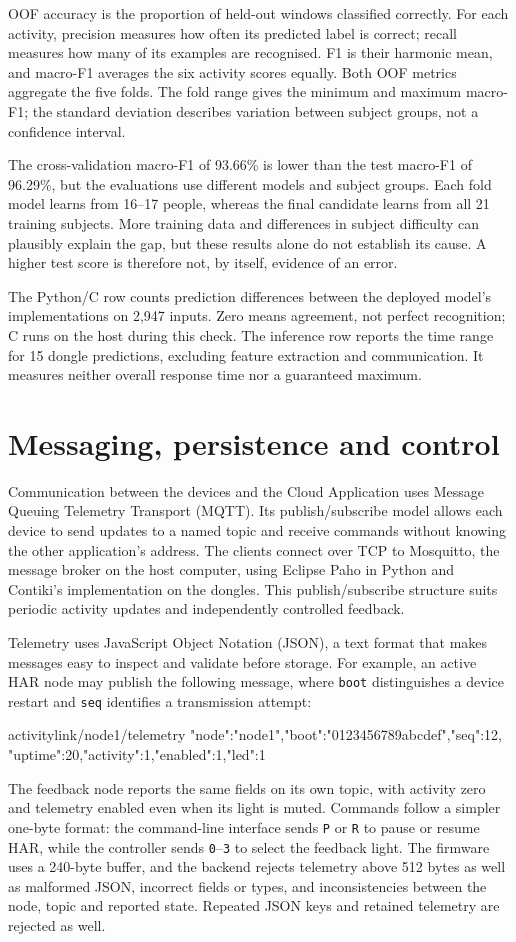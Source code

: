 \documentclass[11pt,a4paper]{article}
\newcommand{\reportsection}[1]{\section{#1}}
\begin{document}
OOF accuracy is the proportion of held-out windows classified correctly. For each activity, precision measures how often its predicted label is correct; recall measures how many of its examples are recognised. F1 is their harmonic mean, and macro-F1 averages the six activity scores equally. Both OOF metrics aggregate the five folds. The fold range gives the minimum and maximum macro-F1; the standard deviation describes variation between subject groups, not a confidence interval.

The cross-validation macro-F1 of 93.66\% is lower than the test macro-F1 of 96.29\%, but the evaluations use different models and subject groups. Each fold model learns from 16--17 people, whereas the final candidate learns from all 21 training subjects. More training data and differences in subject difficulty can plausibly explain the gap, but these results alone do not establish its cause. A higher test score is therefore not, by itself, evidence of an error.

The Python/C row counts prediction differences between the deployed model's implementations on 2,947 inputs. Zero means agreement, not perfect recognition; C runs on the host during this check. The inference row reports the time range for 15 dongle predictions, excluding feature extraction and communication. It measures neither overall response time nor a guaranteed maximum.
\clearpage
\reportsection{Messaging, persistence and control}
Communication between the devices and the Cloud Application uses Message Queuing Telemetry Transport (MQTT). Its publish/subscribe model allows each device to send updates to a named topic and receive commands without knowing the other application's address. The clients connect over TCP to Mosquitto, the message broker on the host computer, using Eclipse Paho in Python and Contiki's implementation on the dongles. This publish/subscribe structure suits periodic activity updates and independently controlled feedback.

Telemetry uses JavaScript Object Notation (JSON), a text format that makes messages easy to inspect and validate before storage. For example, an active HAR node may publish the following message, where \texttt{boot} distinguishes a device restart and \texttt{seq} identifies a transmission attempt:
\begin{Code}
activitylink/node1/telemetry
{"node":"node1","boot":"0123456789abcdef","seq":12,
 "uptime":20,"activity":1,"enabled":1,"led":1}
\end{Code}
The feedback node reports the same fields on its own topic, with activity zero and telemetry enabled even when its light is muted. Commands follow a simpler one-byte format: the command-line interface sends \texttt{P} or \texttt{R} to pause or resume HAR, while the controller sends \texttt{0}--\texttt{3} to select the feedback light. The firmware uses a 240-byte buffer, and the backend rejects telemetry above 512 bytes as well as malformed JSON, incorrect fields or types, and inconsistencies between the node, topic and reported state. Repeated JSON keys and retained telemetry are rejected as well.
\end{document}
